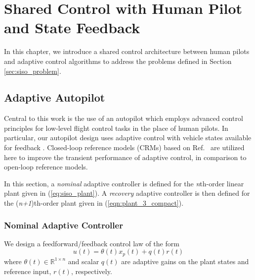 \chapter{Shared Control with Human Pilot and State Feedback} \label{ch:siso_shared_ctrl}


In this chapter, we introduce a shared control architecture between human pilots and adaptive control algorithms to address the problems defined in Section \ref{sec:siso_problem}.

\section{Adaptive Autopilot} \label{sec:siso_sc_adaptive}
Central to this work is the use of an autopilot which employs advanced control principles for low-level flight control tasks in the place of human pilots. In particular, our autopilot design uses adaptive control with vehicle states available for feedback \cite{narendra2012stable}. Closed-loop reference models (CRMs) based on Ref.~\cite{gibson2013adaptive} are utilized here to improve the transient performance of adaptive control, in comparison to open-loop reference models.

In this section, a \textit{nominal} adaptive controller is defined for the \textit{n}th-order linear plant given in (\ref{eq:siso_plant}). A \textit{recovery} adaptive controller is then defined for the (\textit{n+1})th-order plant given in (\ref{eqn:plant_3_compact}).

\subsection{Nominal Adaptive Controller}
We design a feedforward/feedback control law of the form
\begin{equation}
	u(t) = \theta(t) x_p(t) + q(t) r(t)
	\label{eqn:control_law}
\end{equation}
\noindent where $\theta(t) \in \mathbb{R}^{1 \times n}$ and scalar $q(t)$ are adaptive gains on the plant states and reference input, $r(t)$, respectively.

